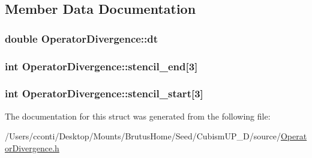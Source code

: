 \subsection{Member Data Documentation}
\hypertarget{struct_operator_divergence_ada6d0bb3bcf2d97b8051e12fc09faa72}{}
\subsubsection[{dt}]{\setlength{\rightskip}{0pt plus 5cm}double Operator\+Divergence\+::dt}\label{struct_operator_divergence_ada6d0bb3bcf2d97b8051e12fc09faa72}
\hypertarget{struct_operator_divergence_a1d109938ee351b7adc0bf85b3cf2656e}{}
\subsubsection[{stencil\+\_\+end}]{\setlength{\rightskip}{0pt plus 5cm}int Operator\+Divergence\+::stencil\+\_\+end\mbox{[}3\mbox{]}}\label{struct_operator_divergence_a1d109938ee351b7adc0bf85b3cf2656e}
\hypertarget{struct_operator_divergence_a748e5b6432ead32ed1570ab7b2ed1346}{}
\subsubsection[{stencil\+\_\+start}]{\setlength{\rightskip}{0pt plus 5cm}int Operator\+Divergence\+::stencil\+\_\+start\mbox{[}3\mbox{]}}\label{struct_operator_divergence_a748e5b6432ead32ed1570ab7b2ed1346}


The documentation for this struct was generated from the following file\+:\begin{DoxyCompactItemize}
\item 
/\+Users/cconti/\+Desktop/\+Mounts/\+Brutus\+Home/\+Seed/\+Cubism\+U\+P\+\_\+D/source/\hyperlink{_operator_divergence_8h}{Operator\+Divergence.\+h}\end{DoxyCompactItemize}
